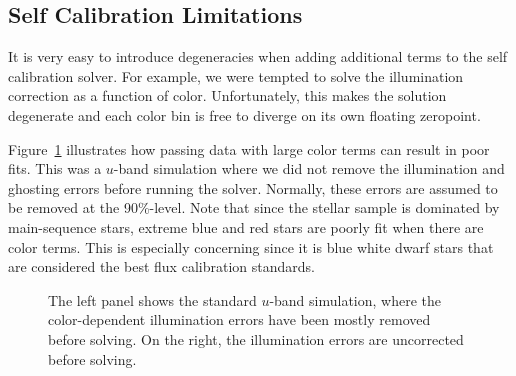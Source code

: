 \documentclass[12pt,preprint]{aastex}
\begin{document}
\subsection{Self Calibration Limitations}

It is very easy to introduce degeneracies when adding additional terms to the self calibration solver.  For example, we were tempted to solve the illumination correction as a function of color.  Unfortunately, this makes the solution degenerate and each color bin is free to diverge on its own floating zeropoint.  

Figure~\ref{fig:badcolor} illustrates how passing data with large color terms can result in poor fits.  This was a $u$-band simulation where we did not remove the illumination and ghosting errors before running the solver.  Normally, these errors are assumed to be removed at the 90\%-level.  Note that since the stellar sample is dominated by main-sequence stars, extreme blue and red stars are poorly fit when there are color terms.  This is especially concerning since it is blue white dwarf stars that are considered the best flux calibration standards.

\begin{figure}
\caption{The left panel shows the standard $u$-band simulation, where the color-dependent illumination errors have been mostly removed before solving.  On the right,  the illumination errors are uncorrected before solving.  \label{fig:badcolor}}
\end{figure}
\end{document}
